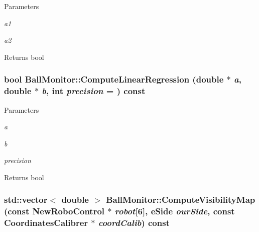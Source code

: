 \begin{DoxyParams}{Parameters}
\item[{\em a1}]\item[{\em a2}]\end{DoxyParams}
\begin{DoxyReturn}{Returns}
bool 
\end{DoxyReturn}
\hypertarget{classBallMonitor_a49645db55ca752adbc2a5a074c7314be}{
\subsubsection[{ComputeLinearRegression}]{\setlength{\rightskip}{0pt plus 5cm}bool BallMonitor::ComputeLinearRegression (double $\ast$ {\em a}, \/  double $\ast$ {\em b}, \/  int {\em precision} = {}) const}}
\label{classBallMonitor_a49645db55ca752adbc2a5a074c7314be}

\begin{DoxyParams}{Parameters}
\item[{\em a}]\item[{\em b}]\item[{\em precision}]\end{DoxyParams}
\begin{DoxyReturn}{Returns}
bool 
\end{DoxyReturn}
\hypertarget{classBallMonitor_ac30119e22cfe4814670c4eae8c6b5495}{
\subsubsection[{ComputeVisibilityMap}]{\setlength{\rightskip}{0pt plus 5cm}std::vector$<$ double $>$ BallMonitor::ComputeVisibilityMap (const {\bf NewRoboControl} $\ast$ {\em robot}\mbox{[}6\mbox{]}, \/  eSide {\em ourSide}, \/  const {\bf CoordinatesCalibrer} $\ast$ {\em coordCalib}) const}}
\label{classBallMonitor_ac30119e22cfe4814670c4eae8c6b5495}

